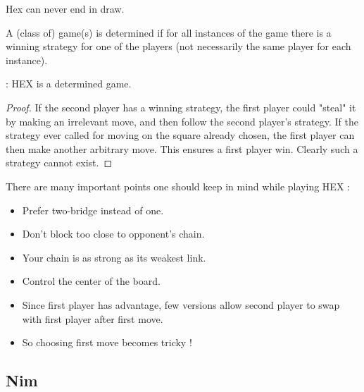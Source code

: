\documentclass[12pt]{beamer}
\begin{document}
\begin{frame}
\begin{theorem}
Hex can never end in draw.
\end{theorem}
\pause
\begin{definition}
A (class of) game(s) is determined if for all instances of the game there is a winning strategy for one of the players (not necessarily the same player for each instance).
\end{definition}
\pause
\begin{block}
 : HEX is a determined game.
\end{block}
\pause
\begin{proof}
If the second player has a winning strategy, the first player could "steal" it by making an irrelevant move, and then follow the second player's strategy. If the strategy ever called for moving on the square already chosen, the first player can then make another arbitrary move. This ensures a first player win. Clearly such a strategy cannot exist.
\end{proof}

\end{frame}

\begin{frame}
There are many important points one should keep in mind while playing HEX :
\begin{itemize}
\pause
\item Prefer two-bridge instead of one.
\pause
\item Don't block too close to opponent's chain.
\pause
\item Your chain is as strong as its weakest link.
\pause
\item Control the center of the board.
\pause
\item Since first player has advantage, few versions allow second player to swap with first player after first move.
\pause
\item So choosing first move becomes tricky !
\end{itemize}
\end{frame}

\subsection{Nim}
\end{document}
